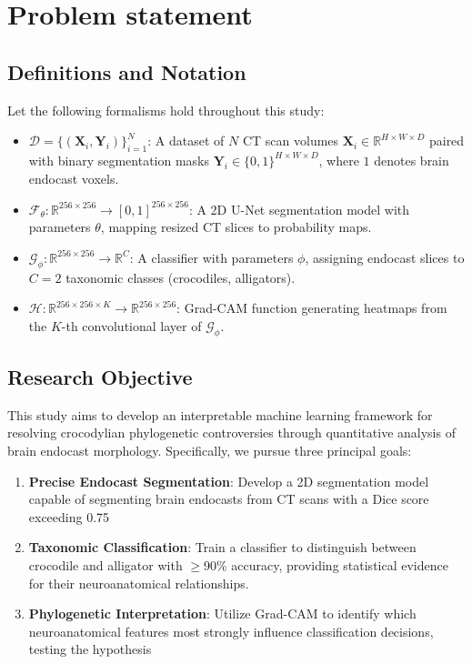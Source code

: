 \chapter{Problem statement}

\section{Definitions and Notation}
Let the following formalisms hold throughout this study:

\begin{itemize}
    \item $\mathcal{D} = \{(\mathbf{X}_i, \mathbf{Y}_i)\}_{i=1}^N$: A dataset of $N$ CT scan volumes $\mathbf{X}_i \in \mathbb{R}^{H \times W \times D}$ paired with binary segmentation masks $\mathbf{Y}_i \in \{0,1\}^{H \times W \times D}$, where $1$ denotes brain endocast voxels.
    
    \item $\mathcal{F}_\theta: \mathbb{R}^{256 \times 256} \rightarrow [0,1]^{256 \times 256}$: A 2D U-Net segmentation model with parameters $\theta$, mapping resized CT slices to probability maps.
    
    \item $\mathcal{G}_\phi: \mathbb{R}^{256 \times 256} \rightarrow \mathbb{R}^C$: A classifier with parameters $\phi$, assigning endocast slices to $C=2$ taxonomic classes (crocodiles, alligators).
    
    \item $\mathcal{H}: \mathbb{R}^{256 \times 256 \times K} \rightarrow \mathbb{R}^{256 \times 256}$: Grad-CAM function generating heatmaps from the $K$-th convolutional layer of $\mathcal{G}_\phi$.
\end{itemize}

\section{Research Objective}
This study aims to develop an interpretable machine learning framework for resolving crocodylian phylogenetic controversies through quantitative analysis of brain endocast morphology. Specifically, we pursue three principal goals:

\begin{enumerate}
    \item \textbf{Precise Endocast Segmentation}: 
    Develop a 2D segmentation model capable of segmenting brain endocasts from CT scans with a Dice score exceeding 0.75
    
    \item \textbf{Taxonomic Classification}: 
    Train a classifier to distinguish between crocodile and alligator with $\geq$90\% accuracy, providing statistical evidence for their neuroanatomical relationships.
    
    \item \textbf{Phylogenetic Interpretation}: 
    Utilize Grad-CAM to identify which neuroanatomical features most strongly influence classification decisions, testing the hypothesis
\end{enumerate}